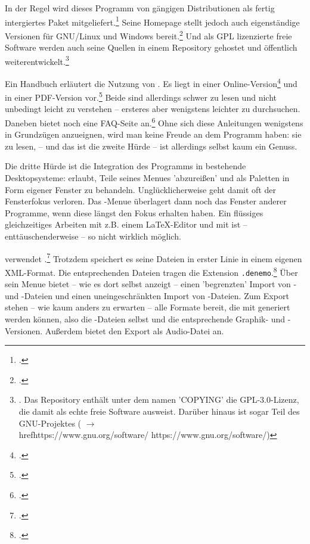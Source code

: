 In der Regel wird dieses Programm von gängigen Distributionen als fertig
intergiertes Paket mitgeliefert.\footcite[vgl. z.B.][\nopage
wp]{UbuntuDenemo2014a} Seine Homepage stellt jedoch auch eigenständige
Versionen für GNU/Linux und Windows bereit.\footcite[vgl.][\nopage
wp]{Denemo2019d} Und als GPL lizenzierte freie Software werden auch seine
Quellen in einem Repository gehostet und öffentlich
weiterentwickelt.\footnote{\cite[vgl.][\nopage wp]{GithubDenemo2019a}.
Das Repository enthält unter dem namen 'COPYING' die GPL-3.0-Lizenz, die
 damit als echte freie Software ausweist. Darüber hinaus ist
 sogar Teil des GNU-Projektes ( $\rightarrow$
\\href{https://www.gnu.org/software/} {https://www.gnu.org/software/})}

Ein Handbuch erläutert die Nutzung von . Es liegt in einer
Online-Version\footcite[vgl.][\nopage wp]{Shann2015a} und in einer
PDF-Version vor.\footcite[vgl.][2ff]{Shann2015b} Beide sind allerdings schwer zu
lesen und nicht unbedingt leicht zu verstehen -- ersteres aber wenigstens leichter
zu durchsuchen. Daneben bietet  noch eine FAQ-Seite
an.\footcite[vgl.][\nopage wp]{Denemo2019c} Ohne sich diese Anleitungen
wenigstens in Grundzügen anzueignen, wird man keine Freude an dem Programm
haben: sie zu lesen, -- und das ist die zweite Hürde -- ist allerdings selbst
kaum ein Genuss.

Die dritte Hürde ist die Integration des Programms in bestehende Desktopsysteme:
 erlaubt, Teile seines Menues 'abzureißen' und als Paletten in Form
eigener Fenster zu behandeln. Unglücklicherweise geht damit oft der Fensterfokus
verloren. Das -Menue überlagert dann noch das Fenster anderer
Programme, wenn diese längst den Fokus erhalten haben. Ein flüssiges
gleichzeitiges Arbeiten mit z.B. einem \LaTeX-Editor und mit  ist
-- enttäuschenderweise -- so nicht wirklich möglich.

 verwendet .\footcite[vgl.][\nopage
wp]{Denemo2019b} Trotzdem speichert es seine Dateien in erster Linie in einem
eigenen XML-Format. Die entsprechenden Dateien tragen die Extension
\texttt{.denemo}.\footcite[vgl. dazu][\nopage wp]{WpedDenemo2018a} Über sein
Menue bietet  -- wie es dort selbst anzeigt -- einen 'begrenzten'
Import von - und -Dateien und einen uneingeschränkten
Import von -Dateien. Zum Export stehen -- wie kaum anders zu
erwarten -- alle Formate bereit, die mit  generiert werden können,
also die -Dateien selbst und die entsprechende Graphik- und
-Versionen. Außerdem bietet  den Export als Audio-Datei an.

